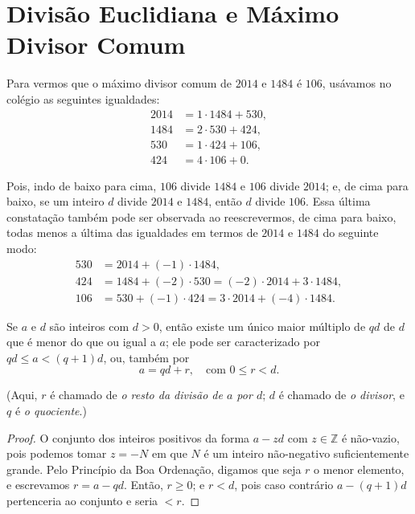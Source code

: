 \section{Divisão Euclidiana e Máximo Divisor Comum}

Para vermos que o máximo divisor comum de $2014$ e $1484$ é $106$, 
usávamos no colégio as seguintes igualdades:
\[
\begin{aligned}
2014 &= 1\cdot 1484 + 530,\\
1484 &= 2\cdot 530 + 424,\\
530  &= 1\cdot 424 + 106,\\
424  &= 4\cdot 106 + 0.
\end{aligned}
\]

Pois, indo de baixo para cima, $106$ divide $1484$ e $106$ divide $2014$; 
e, de cima para baixo, se um inteiro $d$ divide $2014$ e $1484$, 
então $d$ divide $106$. Essa última constatação também pode ser observada 
ao reescrevermos, de cima para baixo, todas menos a última das igualdades 
em termos de $2014$ e $1484$ do seguinte modo:
\[
\begin{aligned}
530 &= 2014 + (-1)\cdot 1484,\\
424 &= 1484 + (-2)\cdot 530 = (-2)\cdot 2014 + 3\cdot 1484,\\
106 &= 530 + (-1)\cdot 424 = 3\cdot 2014 + (-4)\cdot 1484.
\end{aligned}
\]

\medskip

\begin{lema}
Se $a$ e $d$ são inteiros com $d > 0$, então existe um único maior múltiplo de $qd$
de $d$ que é menor do que ou igual a $a$; ele pode ser caracterizado por 
$q d \leq a < (q+1)d$, ou, também por
\[
a = qd + r, \quad \text{com } 0 \leq r < d.
\]

(Aqui, $r$ é chamado de \emph{o resto da divisão de $a$ por $d$}; 
$d$ é chamado de \emph{o divisor}, e $q$ é \emph{o quociente}.)

\end{lema}

\begin{proof}
O conjunto dos inteiros positivos da forma $a - zd$ com $z \in \mathbb{Z}$ é não-vazio, 
pois podemos tomar $z = -N$ em que $N$ é um inteiro não-negativo suficientemente grande. 
Pelo Princípio da Boa Ordenação, digamos que seja $r$ o menor elemento, 
e escrevamos $r = a - qd$. Então, $r \geq 0$; e $r < d$, 
pois caso contrário $a - (q+1)d$ pertenceria ao conjunto e seria $< r$.
\end{proof}

